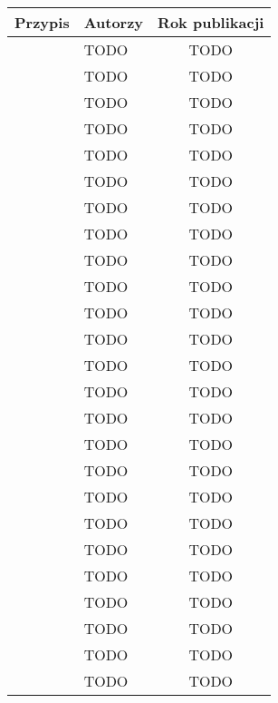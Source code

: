 \begin{table}[h!]
    \centering
    \begin{tabular}{|c|l|c|}
    \hline
    \textbf{Przypis} & \textbf{Autorzy} & \textbf{Rok publikacji} \\
    \hline
    \cite{9284261} & TODO & TODO \\
    \hline
    \cite{9235063} & TODO & TODO \\
    \hline
    \cite{8567674} & TODO & TODO \\
    \hline
    \cite{pawlik2019performanceconsiderationsexecutionlarge} & TODO & TODO \\
    \hline
    \cite{10.1145/3631295.3631394} & TODO & TODO \\
    \hline
    \cite{10.1145/3491204.3543506} & TODO & TODO \\
    \hline
    \cite{9284261} & TODO & TODO \\
    \hline
    \cite{8605777} & TODO & TODO \\
    \hline
    \cite{EBRAHIMI2024103115} & TODO & TODO \\
    \hline
    \cite{8605773} & TODO & TODO \\
    \hline
    \cite{Cordingly2020704} & TODO & TODO \\
    \hline
    \cite{shrestha2019lambda} & TODO & TODO \\
    \hline
    \cite{8116416} & TODO & TODO \\
    \hline
    \cite{9860368} & TODO & TODO \\
    \hline
    \cite{8605779} & TODO & TODO \\
    \hline
    \cite{8844428} & TODO & TODO \\
    \hline
    \cite{FerreiraDosSantos2023} & TODO & TODO \\
    \hline
    \cite{10.1145/3458336.3465305} & TODO & TODO \\
    \hline
    \cite{ritzal2020optimizing} & TODO & TODO \\
    \hline
    \cite{menéndez2023performancebestpracticesusing} & TODO & TODO \\
    \hline
    \cite{9095731} & TODO & TODO \\
    \hline
    \cite{9912641} & TODO & TODO \\
    \hline
    \cite{8605774} & TODO & TODO \\
    \hline
    \cite{10.1145/3377812.3382135} & TODO & TODO \\
    \hline
    \cite{9732138} & TODO & TODO \\

\end{tabular}
\end{table}
